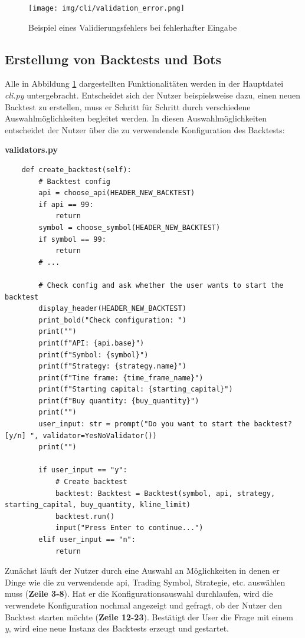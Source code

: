 \documentclass[oneside]{ausarbeitung}
\begin{document}
\begin{figure}[H]
  \centering
  \texttt{[image: img/cli/validation\_error.png]}
  \caption{Beispiel eines Validierungsfehlers bei fehlerhafter Eingabe}
  \label{fig:21}
\end{figure}

\subsection{Erstellung von Backtests und Bots}
\label{sub:erstellung_von_backtests_und_bots}

Alle in Abbildung \ref{fig:21} dargestellten Funktionalitäten werden in der Hauptdatei \textit{cli.py} untergebracht. Entscheidet sich der Nutzer beispielsweise dazu, einen neuen Backtest zu erstellen, muss er Schritt für Schritt durch verschiedene Auswahlmöglichkeiten begleitet werden. In diesen Auswahlmöglichkeiten entscheidet der Nutzer über die zu verwendende Konfiguration des Backtests:

\lstset{language=Python}
\lstset{frame=lines}
\lstset{basicstyle=\footnotesize}
\textbf{validators.py}
\begin{lstlisting}
	def create_backtest(self):
		# Backtest config
		api = choose_api(HEADER_NEW_BACKTEST)
		if api == 99:
			return
		symbol = choose_symbol(HEADER_NEW_BACKTEST)
		if symbol == 99:
			return
		# ...
		
		# Check config and ask whether the user wants to start the backtest
		display_header(HEADER_NEW_BACKTEST)
		print_bold("Check configuration: ")
		print("")
		print(f"API: {api.base}")
		print(f"Symbol: {symbol}")
		print(f"Strategy: {strategy.name}")
		print(f"Time frame: {time_frame_name}")
		print(f"Starting capital: {starting_capital}")
		print(f"Buy quantity: {buy_quantity}")
		print("")
		user_input: str = prompt("Do you want to start the backtest? [y/n] ", validator=YesNoValidator())
		print("")
        
		if user_input == "y":
			# Create backtest
			backtest: Backtest = Backtest(symbol, api, strategy, starting_capital, buy_quantity, kline_limit)
			backtest.run()
			input("Press Enter to continue...")
		elif user_input == "n":
			return
\end{lstlisting}

Zunächst läuft der Nutzer durch eine Auswahl an Möglichkeiten in denen er Dinge wie die zu verwendende \ac{api}, Trading Symbol, Strategie, etc. auswählen muss (\textbf{Zeile 3-8}). Hat er die Konfigurationsauswahl durchlaufen, wird die verwendete Konfiguration nochmal angezeigt und gefragt, ob der Nutzer den Backtest starten möchte (\textbf{Zeile 12-23}). Bestätigt der User die Frage mit einem \textit{y}, wird eine neue Instanz des Backtests erzeugt und gestartet.
\end{document}
